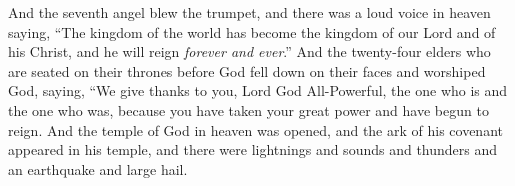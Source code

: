 \begin{biblechapter}
 And the seventh angel blew the trumpet, and there was a loud voice in heaven saying, “The kingdom of the world has become the kingdom of our Lord 
and of his Christ, 
and he will reign \textit{forever and ever}.”
\verse And the twenty-four elders who are seated on their thrones before God fell down on their faces and worshiped God,
\verse saying,
\verse “We give thanks to you, Lord God All-Powerful, 
the one who is and the one who was, 
because you have taken your great power 
and have begun to reign.
\verse And the temple of God in heaven was opened, and the ark of his covenant appeared in his temple, and there were lightnings and sounds and thunders and an earthquake and large hail.
\end{biblechapter}

